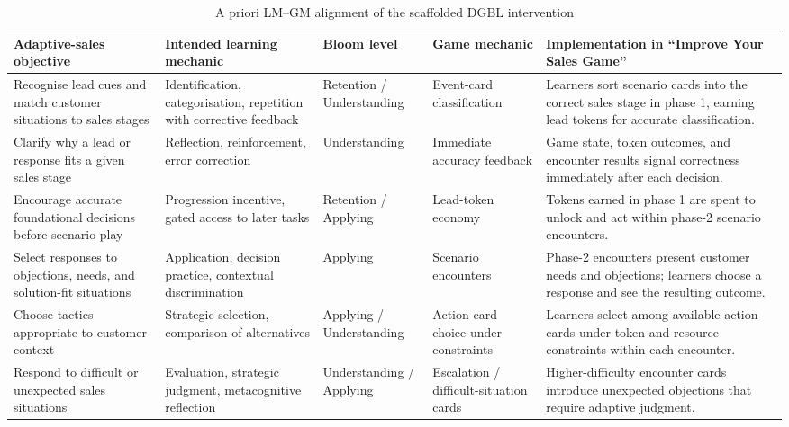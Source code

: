 \documentclass[12pt]{report}
\begin{document}
\begin{table}[htbp]
\centering
\caption{A priori LM--GM alignment of the scaffolded DGBL intervention}
\label{tab:lmgm-alignment-design}
\footnotesize
\setlength{\tabcolsep}{2.5pt}
\begin{tabularx}{\textwidth}{L{2.2cm}L{2.4cm}L{2.15cm}L{2.0cm}Y}
\toprule
\textbf{Adaptive-sales objective} & \textbf{Intended learning mechanic} & \textbf{Bloom level} & \textbf{Game mechanic} & \textbf{Implementation in ``Improve Your Sales Game''} \\
\midrule
Recognise lead cues and match customer situations to sales stages & Identification, categorisation, repetition with corrective feedback & Retention / Understanding & Event-card classification & Learners sort scenario cards into the correct sales stage in phase 1, earning lead tokens for accurate classification. \\
Clarify why a lead or response fits a given sales stage & Reflection, reinforcement, error correction & Understanding & Immediate accuracy feedback & Game state, token outcomes, and encounter results signal correctness immediately after each decision. \\
Encourage accurate foundational decisions before scenario play & Progression incentive, gated access to later tasks & Retention / Applying & Lead-token economy & Tokens earned in phase 1 are spent to unlock and act within phase-2 scenario encounters. \\
Select responses to objections, needs, and solution-fit situations & Application, decision practice, contextual discrimination & Applying & Scenario encounters & Phase-2 encounters present customer needs and objections; learners choose a response and see the resulting outcome. \\
Choose tactics appropriate to customer context & Strategic selection, comparison of alternatives & Applying / Understanding & Action-card choice under constraints & Learners select among available action cards under token and resource constraints within each encounter. \\
Respond to difficult or unexpected sales situations & Evaluation, strategic judgment, metacognitive reflection & Understanding / Applying & Escalation / difficult-situation cards & Higher-difficulty encounter cards introduce unexpected objections that require adaptive judgment. \\
\bottomrule
\end{tabularx}
\normalsize
\setlength{\tabcolsep}{6pt}
\end{table}
\end{document}
